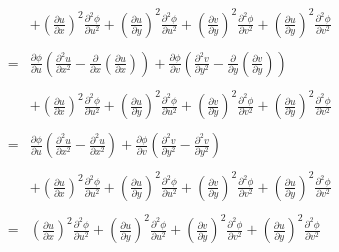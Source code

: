 \documentclass[10pt]{amsart}
\theoremstyle{nonumberplain}
\begin{document}
\begin{enumerate}[label={\bf {\arabic*}:}]
\begin{eqnarray*}
												    && +  \left(\frac{\partial u}{\partial x}\right)^2 \frac{\partial^2 \phi}{\partial u^2}
												        	 + \left(\frac{\partial u}{\partial y}\right)^2 \frac{\partial^2 \phi}{\partial u^2}
													 + \left(\frac{\partial v}{\partial y}\right)^2 \frac{\partial^2 \phi}{\partial v^2} 
													 + \left(\frac{\partial u}{\partial y}\right)^2\frac{\partial^2 \phi}{\partial v^2} \\ \\
												&=& \frac{\partial\phi}{\partial u} \left(\frac{\partial^2 u}{\partial x^2} - \frac{\partial}{\partial x} \left(\frac{\partial u}{\partial x} \right)\right)
													+ \frac{\partial\phi}{\partial v} \left(\frac{\partial^2 v}{\partial y^2} - \frac{\partial}{\partial y} \left(\frac{\partial v}{\partial y} \right) \right) \\ \\
												    && +  \left(\frac{\partial u}{\partial x}\right)^2 \frac{\partial^2 \phi}{\partial u^2}
												        	 + \left(\frac{\partial u}{\partial y}\right)^2 \frac{\partial^2 \phi}{\partial u^2}
													 + \left(\frac{\partial v}{\partial y}\right)^2 \frac{\partial^2 \phi}{\partial v^2} 
													 + \left(\frac{\partial u}{\partial y}\right)^2\frac{\partial^2 \phi}{\partial v^2} \\ \\
												&=& \frac{\partial\phi}{\partial u} \left(\frac{\partial^2 u}{\partial x^2} - \frac{\partial^2 u}{\partial x^2} \right)
													+ \frac{\partial\phi}{\partial v} \left(\frac{\partial^2 v}{\partial y^2} - \frac{\partial^2 v}{\partial y^2} \right) \\ \\
												    && +  \left(\frac{\partial u}{\partial x}\right)^2 \frac{\partial^2 \phi}{\partial u^2}
												        	 + \left(\frac{\partial u}{\partial y}\right)^2 \frac{\partial^2 \phi}{\partial u^2}
													 + \left(\frac{\partial v}{\partial y}\right)^2 \frac{\partial^2 \phi}{\partial v^2} 
													 + \left(\frac{\partial u}{\partial y}\right)^2\frac{\partial^2 \phi}{\partial v^2} \\ \\
												&=& \left(\frac{\partial u}{\partial x}\right)^2 \frac{\partial^2 \phi}{\partial u^2}
												        	 + \left(\frac{\partial u}{\partial y}\right)^2 \frac{\partial^2 \phi}{\partial u^2}
													 + \left(\frac{\partial v}{\partial y}\right)^2 \frac{\partial^2 \phi}{\partial v^2} 
													 + \left(\frac{\partial u}{\partial y}\right)^2\frac{\partial^2 \phi}{\partial v^2} \\ \\

\end{eqnarray*}
\end{enumerate}
\end{document}
